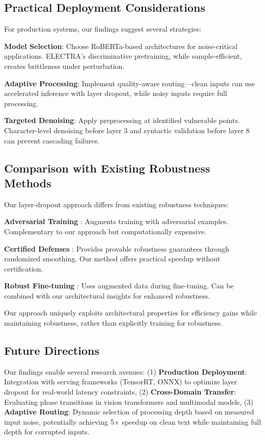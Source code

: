 \subsection{Practical Deployment Considerations}

For production systems, our findings suggest several strategies:

\textbf{Model Selection}: Choose RoBERTa-based architectures for noise-critical applications. ELECTRA's discriminative pretraining, while sample-efficient, creates brittleness under perturbation.

\textbf{Adaptive Processing}: Implement quality-aware routing—clean inputs can use accelerated inference with layer dropout, while noisy inputs require full processing.

\textbf{Targeted Denoising}: Apply preprocessing at identified vulnerable points. Character-level denoising before layer 3 and syntactic validation before layer 8 can prevent cascading failures.

\subsection{Comparison with Existing Robustness Methods}

Our layer-dropout approach differs from existing robustness techniques:

\textbf{Adversarial Training} \cite{madry2018towards}: Augments training with adversarial examples. Complementary to our approach but computationally expensive.

\textbf{Certified Defenses} \cite{cohen2019certified}: Provides provable robustness guarantees through randomized smoothing. Our method offers practical speedup without certification.

\textbf{Robust Fine-tuning} \cite{hendrycks2020augmax}: Uses augmented data during fine-tuning. Can be combined with our architectural insights for enhanced robustness.

Our approach uniquely exploits architectural properties for efficiency gains while maintaining robustness, rather than explicitly training for robustness.

\subsection{Future Directions}

Our findings enable several research avenues: (1) \textbf{Production Deployment}: Integration with serving frameworks (TensorRT, ONNX) to optimize layer dropout for real-world latency constraints, (2) \textbf{Cross-Domain Transfer}: Evaluating phase transitions in vision transformers and multimodal models, (3) \textbf{Adaptive Routing}: Dynamic selection of processing depth based on measured input noise, potentially achieving 5× speedup on clean text while maintaining full depth for corrupted inputs.
